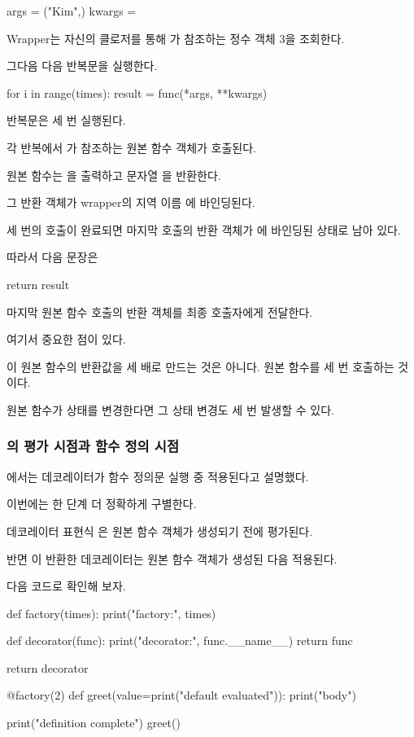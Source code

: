 \begin{dhkzsh}
args = ("Kim",)
kwargs = {}
\end{dhkzsh}

Wrapper는 자신의 클로저를 통해 가 참조하는 정수 객체 3을 조회한다.

그다음 다음 반복문을 실행한다.

\begin{dhkcode}
for i in range(times):
    result = func(*args, **kwargs)
\end{dhkcode}

반복문은 세 번 실행된다.

각 반복에서 가 참조하는 원본  함수 객체가 호출된다.

원본 함수는 을 출력하고 문자열 을 반환한다.

그 반환 객체가 wrapper의 지역 이름 에 바인딩된다.

세 번의 호출이 완료되면 마지막 호출의 반환 객체가 에 바인딩된 상태로 남아 있다.

따라서 다음 문장은

\begin{dhkcode}
return result
\end{dhkcode}

마지막 원본 함수 호출의 반환 객체를 최종 호출자에게 전달한다.

여기서 중요한 점이 있다.

이 원본 함수의 반환값을 세 배로 만드는 것은 아니다. 원본 함수를 세 번 호출하는 것이다.

원본 함수가 상태를 변경한다면 그 상태 변경도 세 번 발생할 수 있다.

\subsubsection{의 평가 시점과 함수 정의 시점}

에서는 데코레이터가 함수 정의문 실행 중 적용된다고 설명했다.

이번에는 한 단계 더 정확하게 구별한다.

데코레이터 표현식 은 원본 함수 객체가 생성되기 전에 평가된다.

반면 이 반환한 데코레이터는 원본 함수 객체가 생성된 다음 적용된다.

다음 코드로 확인해 보자.

\begin{dhkcode}
def factory(times):
    print("factory:", times)

    def decorator(func):
        print("decorator:", func.__name__)
        return func

    return decorator

@factory(2)
def greet(value=print("default evaluated")):
    print("body")

print("definition complete")
greet()
\end{dhkcode}

